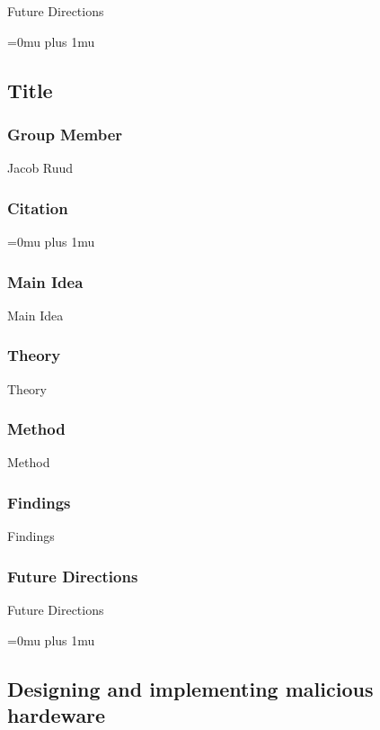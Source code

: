 \noindent
Future Directions 

\Urlmuskip=0mu plus 1mu\relax

\noindent
\subsection{Title}

\subsubsection{Group Member}

\noindent
Jacob Ruud

\noindent
\subsubsection{Citation}

\Urlmuskip=0mu plus 1mu\relax

\subsubsection{Main Idea}

\noindent
Main Idea

\subsubsection{Theory}

\noindent
Theory

\subsubsection{Method}

\noindent
Method

\subsubsection{Findings}

\noindent
Findings

\subsubsection{Future Directions}

\noindent
Future Directions 

\Urlmuskip=0mu plus 1mu\relax

\noindent
\subsection{Designing and implementing malicious hardeware}

